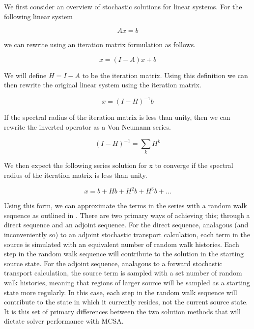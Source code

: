 \documentclass[note]{TechNote}
\begin{document}
We first consider an overview of stochastic solutions for linear
systems. For the following linear system

\begin{equation}
  A x = b
  \label{eq:linear_system}
\end{equation}

we can rewrite using an iteration matrix formulation as follows.

\begin{equation}
  x = (I-A) x + b
  \label{eq:iteration_form}
\end{equation}

We will define $H=I-A$ to be the iteration matrix. Using this
definition we can then rewrite the original linear system using the
iteration matrix.

\begin{equation}
  x = (I-H)^{-1} b
  \label{eq:iteration_form2}
\end{equation}

If the spectral radius of the iteration matrix is less than unity,
then we can rewrite the inverted operator as a Von Neumann series.

\begin{equation}
  (I-H)^{-1} = \sum_k H^k
  \label{eq:von_neumann_series}
\end{equation}

We then expect the following series solution for x to converge if the
spectral radius of the iteration matrix is less than unity.

\begin{equation}
  x = b + H b + H^2 b + H^3 b + ...
  \label{eq:series_solution}
\end{equation}

Using this form, we can approximate the terms in the series with a
random walk sequence as outlined in \cite{hammersley_1964}. There are
two primary ways of achieving this; through a direct sequence and an
adjoint sequence. For the direct sequence, analagous (and
inconveniently so) to an adjoint stochastic transport calculation,
each term in the source is simulated with an equivalent number of
random walk histories. Each step in the random walk sequence will
contribute to the solution in the starting source state. For the
adjoint sequence, analagous to a forward stochastic transport
calculation, the source term is sampled with a set number of random
walk histories, meaning that regions of larger source will be sampled
as a starting state more regularly. In this case, each step in the
random walk sequence will contribute to the state in which it
currently resides, not the current source state. It is this set of
primary differences between the two solution methods that will dictate
solver performance with MCSA.
\end{document}
